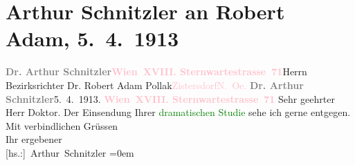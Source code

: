 

               \section[Arthur Schnitzler an Robert Adam, 5. 4. 1913]{ Arthur Schnitzler an Robert Adam, 5. 4. 1913}\nopagebreak{}\rehead{ }\normalsize\beginnumbering{} \toendnotes[C]{\smallbreak\pagebreak[2]} 
\toendnotes[C]{\smallbreak}\pstart{}{\pb}\textcolor{gray}{\textbf{Dr. Arthur Schnitzler}}\pend{}\pstart{}\textcolor{gray}{\textbf{\textcolor{pink}{Wien XVIII. Sternwartestrasse 71}{}\ledrightnote{\textcolor{pink}{Sternwartestraße}}}}\pend{}{\bigskip}\pstart{}{\pb}Herrn Bezirksrichter Dr. Robert Adam
                        Pollak\pend{}\pstart{}\textcolor{pink}{Zistersdorf}{}\ledrightnote{\textcolor{pink}{Zistersdorf}}\pend{}\pstart{}\textcolor{pink}{N. Oe.}{}\ledrightnote{\textcolor{pink}{Niederösterreich}}\pend{}{\bigskip}\pstart
           \noindent{}{\pb}\textcolor{gray}{\textbf{Dr. Arthur Schnitzler}}\hfill 5. 4. 1913.\pend
           \pstart
           \textcolor{gray}{\textbf{\textcolor{pink}{Wien XVIII. Sternwartestrasse 71}{}\ledrightnote{\textcolor{pink}{Sternwartestraße}}}}\pend
           \pstart\center{}Sehr geehrter Herr Doktor.\pend\pstart
           Der Einsendung Ihrer \textcolor{green}{dramatischen
                        Studie}{} sehe ich gerne entgegen.\pend
           \pstart
           Mit verbindlichen Grüssen{\\[\baselineskip]}Ihr ergebener{\\[\baselineskip]}\spacefill\mbox{{[}hs.:{]} Arthur Schnitzler}\pend
           \leftskip=0em{}\endnumbering{}  
      